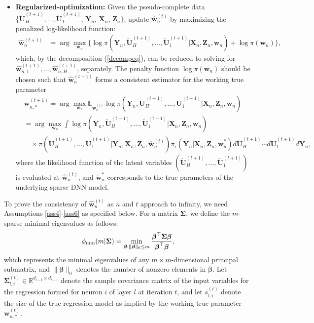 \documentclass[11pt]{article}
\newcommand{\bX}{{\boldsymbol X}}
\newcommand{\bY}{{\boldsymbol Y}}
\newcommand{\bZ}{{\boldsymbol Z}}
\newcommand{\bw}{{\boldsymbol w}}
\newcommand{\bU}{{\boldsymbol U}}
\newcommand{\bbeta}{{\boldsymbol \beta}}
\newcommand{\bSigma}{{\boldsymbol \Sigma}}
\begin{document}
\begin{itemize}
  \item {\bf Regularized-optimization:} Given the pseudo-complete data $\{ \tilde{\bU}_H^{(t+1)},\ldots, \tilde{\bU}_1^{(t+1)}$, $\bY_n$, $\bX_n$, 
   $\bZ_n\}$, 
  update  $\hat{\bw}_n^{(t)}$ by maximizing the penalized log-likelihood function: 
  \begin{equation} \label{IROsolution}
  \begin{split}
  \hat{\bw}_n^{(t+1)} & =\arg\max_{\bw_n}\Big\{ \log \pi(\bY_n, \tilde{\bU}_H^{(t+1)},\ldots, \tilde{\bU}_1^{(t+1)}|\bX_n,\bZ_n,\bw_n) +\log \pi(\bw_n) \Big\}, 
 \end{split}
\end{equation}
 which, by the decomposition (\ref{decompeq}), can be reduced to solving 
 for  $\hat{\bw}_{n,1}^{(t+1)}, \ldots, \hat{\bw}_{n,H}^{(t+1)}$, separately. 
 The penalty function $\log \pi(\bw_n)$ should be chosen such that $\hat{\bw}_n^{(t+1)}$ forms a consistent estimator for the working true parameter 
 \begin{equation} \label{mappingeq}
 \begin{split}
 &\bw_{n,*}^{(t+1)} =\arg\max_{\bw_n} \mathbb{E}_{\hat{\bw}_n^{(t)}} 
 \log \pi(\bY_n, \tilde{\bU}_H^{(t+1)},\ldots, \tilde{\bU}_1^{(t+1)}|\bX_n,\bZ_n,\bw_n) \\
 & = \arg\max_{\bw_n}   
 \int \log \pi(\bY_n, \tilde{\bU}_H^{(t+1)},\ldots, \tilde{\bU}_1^{(t+1)}|\bX_n,\bZ_n,\bw_n) \\ 
 &  \quad \times \pi( \tilde{\bU}_H^{(t+1)},\ldots, \tilde{\bU}_1^{(t+1)}|\bY_n,\bX_n,\bZ_n,\hat{\bw}_n^{(t)}) \pi_{\epsilon}(\bY_n|\bX_n, \bZ_n,\tilde{\bw}_n^*) 
 d\tilde{\bU}_H^{(t+1)} \cdots d\tilde{\bU}_1^{(t+1)} d\bY_n,
 \end{split}
 \end{equation}
 where the likelihood function of the latent variables $(\tilde{\bU}_H^{(t+1)},\ldots, \tilde{\bU}_1^{(t+1)})$ is evaluated at $\hat{\bw}_n^{(t)}$, and  
 $\tilde{\bw}_n^*$ corresponds to  the true parameters of the underlying sparse DNN model. 
 \end{itemize}

To prove the consistency of $\hat{\bw}_n^{(t)}$ as $n$ and $t$ approach to infinity,
we need Assumptions \ref{ass4}-\ref{ass6} as specified below. 
For a matrix $\bSigma$, we define the $m$-sparse minimal eigenvalues as follows: 
\[
\phi_{\rm \min}(m|\bSigma)=\min_{\bbeta: \|\bbeta\|_0 \leq m} \frac{\bbeta^{\top} \bSigma \bbeta}{\bbeta^{\top} \bbeta},
\]
which represents the minimal eigenvalues of any $m\times m$-dimensional principal submatrix, and $\|\bbeta\|_0$ denotes the number of nonzero elements in $\bbeta$.
Let $\bSigma_{l,i}^{(t)} \in \mathbb{R}^{d_{l-1} \times d_{l-1}}$ denote the sample covariance matrix of the input variables for the regression formed 
for neuron $i$ of layer $l$ at iteration $t$, and 
let $s_{l,i}^{(t)}$ denote the size of the true regression model 
as implied by the working true parameter $\bw_{n,*}^{(t)}$. 
\end{document}
